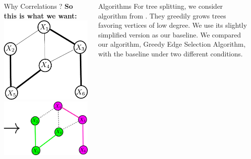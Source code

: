 \documentclass[serif,mathserif,final]{beamer}
\newcommand{\itemlinespace}{0.3in}
\newcommand{\insertlinespace}{\vspace{\itemlinespace}}
\begin{document}
\begin{frame}{}
\begin{columns}[t]
\begin{column}{0.49\linewidth}
\begin{block}{\Huge Why Correlations ?}
{        \textbf{So this is what we want:}  \\
        \insertlinespace
        \hspace{2in} 
        \includegraphics[width=4in]{figs/weighted} \hspace{0.4in}
        \includegraphics[width=6in]{figs/weighted_partition2}
      }
      \end{block}

    \end{column}%

    \begin{column}{0.49\linewidth}
      \begin{block}{\Huge Algorithms}
		  {\huge 
			  For tree splitting, we consider algorithm from \cite{}.
			  They greedily grows trees favoring vertices of low
			  degree. We use its slightly simplified version as our
			  baseline. We compared our algorithm, Greedy Edge
			  Selection Algorithm, with the baseline under two
			  different conditions.
		  }	


\end{block}
\end{column}
\end{columns}
\end{frame}
\end{document}

